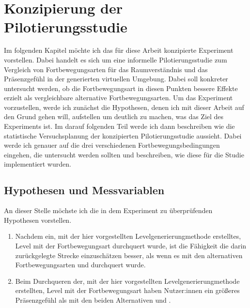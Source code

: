 \chapter{Konzipierung der Pilotierungsstudie}\label{chapter:experiment}
    Im folgenden Kapitel möchte ich das für diese Arbeit konzipierte Experiment vorstellen. Dabei handelt es sich um eine informelle Pilotierungsstudie zum Vergleich von Fortbewegungsarten für das Raumverständnis und das Präsenzgefühl in der generierten virtuellen Umgebung. Dabei soll konkreter untersucht werden, ob die Fortbewegungsart  in diesen Punkten bessere Effekte erzielt als vergleichbare alternative Fortbewegungsarten.
    Um das Experiment vorzustellen, werde ich zunächst die Hypothesen, denen ich mit dieser Arbeit auf den Grund gehen will, aufstellen um deutlich zu machen, was das Ziel des Experiments ist.
    Im darauf folgenden Teil werde ich dann beschreiben wie die statistische Versuchsplanung der konzipierten Pilotierungsstudie aussieht. Dabei werde ich genauer auf die drei verschiedenen Fortbewegungsbedingungen eingehen, die untersucht werden sollten und beschreiben, wie diese für die Studie implementiert wurden.

    \section{Hypothesen und Messvariablen}
        An dieser Stelle möchste ich die in dem Experiment zu überprüfenden Hypothesen vorstellen.

        \begin{enumerate}
            \item Nachdem ein, mit der hier vorgestellten Levelgenerierungmethode erstelltes, Level mit der Fortbewegungsart  durchquert wurde, ist die Fähigkeit die darin zurückgelegte Strecke einzuschätzen besser, als wenn es mit den alternativen Fortbewegungsarten  und  durchquert wurde.

            \item Beim Durchqueren der, mit der hier vorgestellten Levelgenerierungmethode erstellten, Level mit der  Fortbewegungsart haben Nutzer:innen ein größeres Präsenzgefühl als mit den beiden Alternativen  und .
        \end{enumerate}

